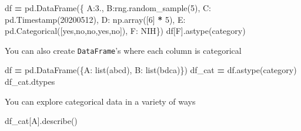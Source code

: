 \documentclass[
  letterpaper,
]{scrbook}
\newenvironment{Shaded}{\begin{snugshade}}{\end{snugshade}}
\newcommand{\BuiltInTok}[1]{#1}
\newcommand{\DecValTok}[1]{\textcolor[rgb]{0.00,0.00,0.81}{#1}}
\newcommand{\FloatTok}[1]{\textcolor[rgb]{0.00,0.00,0.81}{#1}}
\newcommand{\NormalTok}[1]{#1}
\newcommand{\OperatorTok}[1]{\textcolor[rgb]{0.81,0.36,0.00}{\textbf{#1}}}
\newcommand{\StringTok}[1]{\textcolor[rgb]{0.31,0.60,0.02}{#1}}
\begin{document}
\begin{Shaded}
\begin{Highlighting}[]
\NormalTok{df }\OperatorTok{=}\NormalTok{ pd.DataFrame(\{}
    \StringTok{\textquotesingle{}A\textquotesingle{}}\NormalTok{:}\FloatTok{3.}\NormalTok{,}
    \StringTok{\textquotesingle{}B\textquotesingle{}}\NormalTok{:rng.random\_sample(}\DecValTok{5}\NormalTok{),}
    \StringTok{\textquotesingle{}C\textquotesingle{}}\NormalTok{: pd.Timestamp(}\StringTok{\textquotesingle{}20200512\textquotesingle{}}\NormalTok{),}
    \StringTok{\textquotesingle{}D\textquotesingle{}}\NormalTok{: np.array([}\DecValTok{6}\NormalTok{] }\OperatorTok{*} \DecValTok{5}\NormalTok{),}
    \StringTok{\textquotesingle{}E\textquotesingle{}}\NormalTok{: pd.Categorical([}\StringTok{\textquotesingle{}yes\textquotesingle{}}\NormalTok{,}\StringTok{\textquotesingle{}no\textquotesingle{}}\NormalTok{,}\StringTok{\textquotesingle{}no\textquotesingle{}}\NormalTok{,}\StringTok{\textquotesingle{}yes\textquotesingle{}}\NormalTok{,}\StringTok{\textquotesingle{}no\textquotesingle{}}\NormalTok{]),}
    \StringTok{\textquotesingle{}F\textquotesingle{}}\NormalTok{: }\StringTok{\textquotesingle{}NIH\textquotesingle{}}\NormalTok{\})}
\NormalTok{df[}\StringTok{\textquotesingle{}F\textquotesingle{}}\NormalTok{].astype(}\StringTok{\textquotesingle{}category\textquotesingle{}}\NormalTok{)}
\end{Highlighting}
\end{Shaded}

You can also create \texttt{DataFrame}'s where each column is categorical

\begin{Shaded}
\begin{Highlighting}[]
\NormalTok{df }\OperatorTok{=}\NormalTok{ pd.DataFrame(\{}\StringTok{\textquotesingle{}A\textquotesingle{}}\NormalTok{: }\BuiltInTok{list}\NormalTok{(}\StringTok{\textquotesingle{}abcd\textquotesingle{}}\NormalTok{), }\StringTok{\textquotesingle{}B\textquotesingle{}}\NormalTok{: }\BuiltInTok{list}\NormalTok{(}\StringTok{\textquotesingle{}bdca\textquotesingle{}}\NormalTok{)\})}
\NormalTok{df\_cat }\OperatorTok{=}\NormalTok{ df.astype(}\StringTok{\textquotesingle{}category\textquotesingle{}}\NormalTok{)}
\NormalTok{df\_cat.dtypes}
\end{Highlighting}
\end{Shaded}

You can explore categorical data in a variety of ways

\begin{Shaded}
\begin{Highlighting}[]
\NormalTok{df\_cat[}\StringTok{\textquotesingle{}A\textquotesingle{}}\NormalTok{].describe()}
\end{Highlighting}
\end{Shaded}
\end{document}
